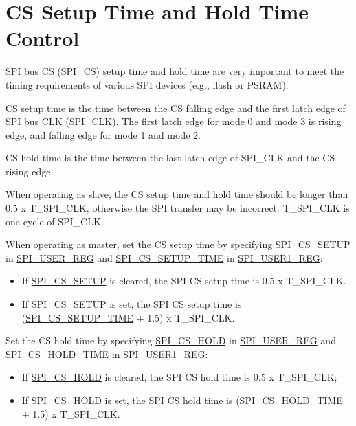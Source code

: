 \documentclass[main\_\_EN.tex]{subfiles}
\begin{document}
\section{CS Setup Time and Hold Time Control}\label{sec:spi-cs-setup-hold-time-control}

SPI bus CS (SPI\_CS) setup time and hold time are very important to meet the timing requirements of various SPI devices (e.g., flash or PSRAM).

CS setup time is the time between the CS falling edge and the first latch edge of SPI bus CLK (SPI\_CLK). The first latch edge for mode 0 and mode 3 is rising edge, and falling edge for mode 1 and mode 2.

CS hold time is the time between the last latch edge of SPI\_CLK and the CS rising edge.

When operating as slave, the CS setup time and hold time should be longer than 0.5 x T\_SPI\_CLK, otherwise the SPI transfer may be incorrect. T\_SPI\_CLK is one cycle of SPI\_CLK.

When operating as master, set the CS setup time by specifying \hyperref[fielddesc:SPICSSETUP]{SPI\_CS\_SETUP} in \hyperref[regdesc:SPIUSERREG]{SPI\_USER\_REG} and  \hyperref[fielddesc:SPICSSETUPTIME]{SPI\_CS\_SETUP\_TIME} in \hyperref[regdesc:SPIUSER1REG]{SPI\_USER1\_REG}:
    \begin{itemize}
        \item If \hyperref[fielddesc:SPICSSETUP]{SPI\_CS\_SETUP} is cleared, the SPI CS setup time is 0.5 x T\_SPI\_CLK.
        \item If \hyperref[fielddesc:SPICSSETUP]{SPI\_CS\_SETUP} is set, the SPI CS setup time is (\hyperref[fielddesc:SPICSSETUPTIME]{SPI\_CS\_SETUP\_TIME} + 1.5) x T\_SPI\_CLK.
    \end{itemize}

Set the CS hold time by specifying \hyperref[fielddesc:SPICSHOLD]{SPI\_CS\_HOLD} in \hyperref[regdesc:SPIUSERREG]{SPI\_USER\_REG} and  \hyperref[fielddesc:SPICSHOLDTIME]{SPI\_CS\_HOLD\_TIME} in \hyperref[regdesc:SPIUSER1REG]{SPI\_USER1\_REG}:
    \begin{itemize}
        \item If \hyperref[fielddesc:SPICSHOLD]{SPI\_CS\_HOLD} is cleared, the SPI CS hold time is 0.5 x T\_SPI\_CLK;
        \item If \hyperref[fielddesc:SPICSHOLD]{SPI\_CS\_HOLD} is set, the SPI CS hold time is (\hyperref[fielddesc:SPICSHOLDTIME]{SPI\_CS\_HOLD\_TIME} + 1.5) x T\_SPI\_CLK.
    \end{itemize}
\end{document}
